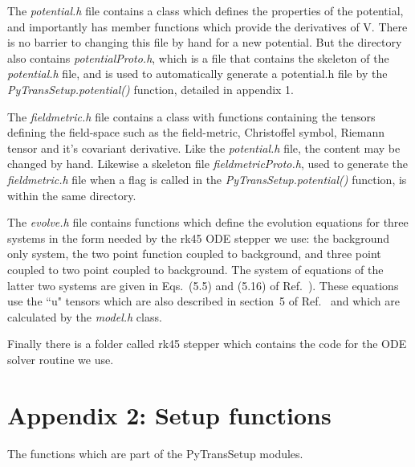 \documentclass[10pt,
amsmath,amssymb,
aps,prd,nofootinbib,eqsecnum,a4paper]{revtex4}
\begin{document}
The {\it potential.h} file contains a class which defines the properties of the potential, and importantly has member functions which provide the derivatives of V. There is no barrier to changing this file by hand for a new potential. But the directory also contains {\it potentialProto.h}, which is a file that contains the skeleton of the {\it potential.h} file, and is used to automatically generate a potential.h file by the {\it PyTransSetup.potential()} function, detailed in appendix 1. 

The {\it fieldmetric.h} file contains a class with functions containing the tensors defining the field-space such as the field-metric, Christoffel symbol, Riemann tensor and it's covariant derivative. Like the {\it potential.h} file, the content may be changed by hand. Likewise a skeleton file {\it fieldmetricProto.h}, used to generate the {\it fieldmetric.h} file when a flag is called in the {\it PyTransSetup.potential()} function, is within the same directory.

The {\it evolve.h} file contains functions which define the evolution equations for three systems in the form needed 
by the rk45 ODE stepper we use: the background only system, the two point function  
coupled to background, and three point coupled to two point coupled to background. The system of equations of the latter two systems 
are given 
in Eqs.~(5.5) and (5.16) of Ref.~\cite{xxx}). These equations use the ``u" tensors which are also described in 
section~5 of Ref.~\cite{xxx} and 
which are calculated by the {\it model.h} class.  

Finally there is a folder called rk45 stepper
which contains the code for the ODE solver routine we use.


\section*{Appendix 2: Setup functions}

The functions which are part of the { PyTransSetup} modules.
\end{document}
